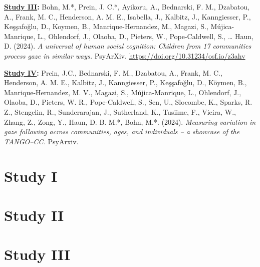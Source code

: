\documentclass[
]{scrbook}
\begin{document}
\textbf{\hyperref[studyIII]{Study III}:} Bohn, M.*, Prein, J. C.*, Ayikoru, A., Bednarski, F. M., Dzabatou, A., Frank, M. C., Henderson, A. M. E., Isabella, J., Kalbitz, J., Kanngiesser, P., Keşşafoğlu, D., Koymen, B., Manrique-Hernandez, M., Magazi, S., Mújica-Manrique, L., Ohlendorf, J., Olaoba, D., Pieters, W., Pope-Caldwell, S., \ldots{} Haun, D. (2024). \emph{A universal of human social cognition: Children from 17 communities process gaze in similar ways.} PsyArXiv. \url{https://doi.org/10.31234/osf.io/z3ahv}

\textbf{\hyperref[studyIV]{Study IV}:} Prein, J.C., Bednarski, F. M., Dzabatou, A., Frank, M. C., Henderson, A. M. E., Kalbitz, J., Kanngiesser, P., Keşşafoğlu, D., Köymen, B., Manrique-Hernandez, M. V., Magazi, S., Mújica-Manrique, L., Ohlendorf, J., Olaoba, D., Pieters, W. R., Pope-Caldwell, S., Sen, U., Slocombe, K., Sparks, R. Z., Stengelin, R., Sunderarajan, J., Sutherland, K., Tusiime, F., Vieira, W., Zhang, Z., Zong, Y., Haun, D. B. M.*, Bohn, M.*. (2024). \emph{Measuring variation in gaze following across communities, ages, and individuals -- a showcase of the TANGO--CC.} PsyArxiv.

\newpage

\section{Study I}\label{studyI}

\begin{minipage}{\textwidth}

\end{minipage}



\newpage

\section{Study II}\label{studyII}

\begin{minipage}{\textwidth}

\end{minipage}



\newpage

\section{Study III}\label{studyIII}
\end{document}
